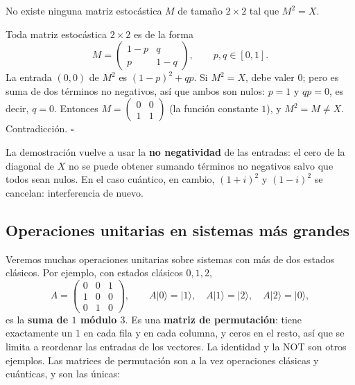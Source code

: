 \documentclass[11pt, a4paper, twoside, openright]{report}
\begin{document}
\begin{tcolorbox}[colback=teal!5!white,colframe=teal!75!black,title=\textbf{Proposición: No existe una raíz cuadrada clásica de NOT}]
No existe ninguna matriz estocástica $M$ de tamaño $2 \times 2$ tal que $M^2 = X$.
\end{tcolorbox}

\begin{tcolorbox}[colback=gray!5!white,colframe=gray!75!black,title=\textbf{Demostración}]
Toda matriz estocástica $2\times 2$ es de la forma
\[ M = \begin{pmatrix} 1-p & q \\ p & 1-q \end{pmatrix}, \qquad p, q \in [0,1]. \]
La entrada $(0,0)$ de $M^2$ es $(1-p)^2 + qp$. Si $M^2 = X$, debe valer $0$; pero es suma de dos términos no negativos, así que ambos son nulos: $p = 1$ y $qp = 0$, es decir, $q = 0$. Entonces $M = \begin{pmatrix} 0 & 0 \\ 1 & 1 \end{pmatrix}$ (la función constante $1$), y $M^2 = M \neq X$. Contradicción. \hfill $\square$

La demostración vuelve a usar la \textbf{no negatividad} de las entradas: el cero de la diagonal de $X$ no se puede obtener sumando términos no negativos salvo que todos sean nulos. En el caso cuántico, en cambio, $(1+i)^2$ y $(1-i)^2$ se cancelan: interferencia de nuevo.
\end{tcolorbox}

\subsection{Operaciones unitarias en sistemas más grandes}

\noindent Veremos muchas operaciones unitarias sobre sistemas con más de dos estados clásicos. Por ejemplo, con estados clásicos $0, 1, 2$,
\[
A = \begin{pmatrix} 0 & 0 & 1 \\ 1 & 0 & 0 \\ 0 & 1 & 0 \end{pmatrix}, \qquad A|0\rangle = |1\rangle, \quad A|1\rangle = |2\rangle, \quad A|2\rangle = |0\rangle,
\]
es la \textbf{suma de $1$ módulo $3$}. Es una \textbf{matriz de permutación}: tiene exactamente un $1$ en cada fila y en cada columna, y ceros en el resto, así que se limita a reordenar las entradas de los vectores. La identidad y la NOT son otros ejemplos. Las matrices de permutación son a la vez operaciones clásicas y cuánticas, y son las únicas:
\end{document}
